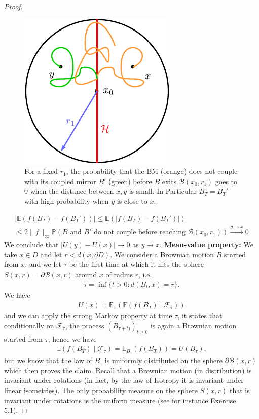 \documentclass[../mainfile.tex]{subfiles}
\begin{document}
\begin{proof}
\begin{figure}[hbtp]
\centering
\includegraphics[scale=1]{couplingproof.pdf}
\caption{For a fixed $r_1$, the probability that the BM (orange) does not couple with its coupled mirror $B'$ (green) before $B$ exits $\mathcal{B}(x_0,r_1)$ goes to $0$ when the distance between $x,y$ is small. In Particular $B_T=B_T'$ with high probability when $y$ is close to $x$.}
\end{figure}
\begin{align*}
|\mathbb{E}(f(B_T)-f(B_T'))| \leq \mathbb{E}(|f(B_T)-f(B_T')|) \\
\leq 2 \|f\|_\infty \mathbb{P}(B \text{ and } B' \text{ do not couple before reaching } \mathcal{B}(x_0,r_1)) \overset{y \to x}\longrightarrow 0
\end{align*}
We conclude that $|U(y)-U(x)| \to 0$ as $y \to x$. 
\newpage
\textbf{Mean-value property:} We take $x \in D$ and let $r < d(x, \partial D)$. We consider a Brownian motion $B$ started from $x$, and we let $\tau$ be the first time at which it hits the sphere $S(x,r)=\partial \mathcal{B}(x,r)$ around $x$ of radius $r$, i.e. 
\begin{align*}
\tau = \inf \{ t>0 : d(B_t,x)=r \}. 
\end{align*}
We have 
\begin{align*}
U(x)=\mathbb{E}_x(\mathbb{E}(f(B_T) \mid \mathcal{F}_\tau))
\end{align*}
and we can apply the strong Markov property at time $\tau$, it states that conditionally on $\mathcal{F}_\tau$, the process $(B_{\tau+t)})_{t \geq 0}$ is again  a Brownian motion started from $\tau$, hence we have
\begin{align*}
\mathbb{E}(f(B_T) \mid \mathcal{F}_\tau ) = \mathbb{E}_{B_\tau}(f(B_T))=U(B_\tau),
\end{align*}
but we know that the law of $B_\tau$ is uniformly distributed on the sphere $\partial \mathcal{B}(x,r)$ which then proves the claim. Recall that a Brownian motion (in distribution) is invariant under rotations (in fact, by the law of Isotropy it is invariant under linear isometries). The only probability measure on the sphere $S(x,r)$ that is invariant under rotations is the uniform measure (see for instance Exercise 5.1).

\end{proof}
\end{document}
